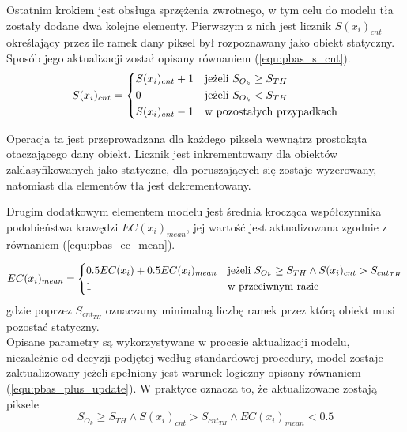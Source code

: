 Ostatnim krokiem jest obsługa sprzężenia zwrotnego, w tym celu do modelu tła zostały dodane dwa kolejne elementy. 
Pierwszym z nich jest licznik $S(x_i)_{cnt}$ określający przez ile ramek dany piksel był rozpoznawany jako obiekt statyczny. 
Sposób jego aktualizacji został opisany równaniem (\ref{equ:pbas_s_cnt}). 
    \begin{equation}
	    S(x_i)_{cnt} = 
		\begin{dcases}
    		S(x_i)_{cnt} + 1 & \text{jeżeli } S_{O_k} \geq  S_{TH}	 \\
            0                & \text{jeżeli } S_{O_k} <  S_{TH}	     \\		
    		S(x_i)_{cnt} - 1 & \text{w pozostałych przypadkach} 
		\end{dcases}
	\label{equ:pbas_s_cnt}	
	\end{equation}

\noindent Operacja ta jest przeprowadzana dla każdego piksela wewnątrz prostokąta otaczającego dany obiekt. Licznik jest inkrementowany dla obiektów zaklasyfikowanych jako statyczne, dla poruszających się zostaje wyzerowany, natomiast dla elementów tła jest dekrementowany.

Drugim dodatkowym elementem modelu jest średnia krocząca współczynnika podobieństwa krawędzi $EC(x_i)_{mean}$, jej wartość jest aktualizowana zgodnie z równaniem (\ref{equ:pbas_ec_mean}).

    \begin{equation}
	    EC(x_i)_{mean} = 
		\begin{dcases}
    		0.5EC(x_i) + 0.5EC(x_i)_{mean} & \text{jeżeli } S_{O_k} \geq  S_{TH} \land S(x_i)_{cnt} > S_{{cnt}_{TH}}	 \\
            1                & \text{w przeciwnym razie}		
		\end{dcases}
	\label{equ:pbas_ec_mean}	
	\end{equation}
\noindent gdzie poprzez $S_{{cnt}_{TH}}$ oznaczamy minimalną liczbę ramek przez którą obiekt musi pozostać statyczny.
\\
\noindent Opisane parametry są wykorzystywane w procesie aktualizacji modelu, niezależnie od decyzji podjętej według standardowej procedury, model zostaje zaktualizowany jeżeli spełniony jest warunek logiczny opisany równaniem (\ref{equ:pbas_plus_update}). W praktyce oznacza to, że aktualizowane zostają piksele 
    \begin{equation}
	    S_{O_k} \geq S_{TH} \land S(x_i)_{cnt} > S_{cnt_{TH}} \land EC(x_i)_{mean} < 0.5
	\label{equ:pbas_plus_update}	
	\end{equation}
	
